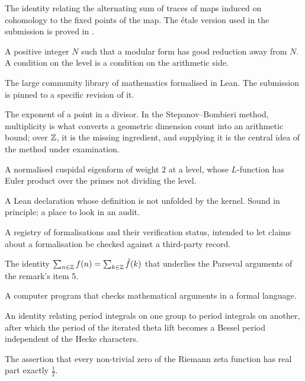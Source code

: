 \begin{description}[style=nextline,leftmargin=0pt,labelwidth=0pt,labelsep=0pt,font=\sffamily\bfseries\small,
  itemsep=5pt]
\item[Lefschetz fixed-point formula] The identity relating the alternating sum
of traces of maps induced on cohomology to the fixed points of the map. The
étale version used in the submission is proved in
.

\item[Level] A positive integer $N$ such that a modular form has good
reduction away from $N$. A condition on the level is a condition on the
arithmetic side.

\item[Mathlib] The large community library of mathematics formalised in Lean.
The submission is pinned to a specific revision of it.

\item[Multiplicity] The exponent of a point in a divisor. In the
Stepanov--Bombieri method, multiplicity is what converts a geometric dimension
count into an arithmetic bound; over $\mathbb{Z}$, it is the missing ingredient, and
supplying it is the central idea of the method under examination.

\item[Newform] A normalised cuspidal eigenform of weight $2$ at a level, whose
$L$-function has Euler product over the primes not dividing the level.

\item[\texttt{opaque}] A Lean declaration whose definition is not unfolded by
the kernel. Sound in principle; a place to look in an audit.

\item[Palomar registry] A registry of formalisations and their verification
status, intended to let claims about a formalisation be checked against a
third-party record.

\item[Poisson summation] The identity
$\sum_{n \in \mathbb{Z}} f(n) = \sum_{k \in \mathbb{Z}} \hat f(k)$ that underlies the
Parseval arguments of the remark's item 5.

\item[Proof assistant] A computer program that checks mathematical arguments
in a formal language.

\item[Rallis seesaw] An identity relating period integrals on one group to
period integrals on another, after which the period of the iterated theta
lift becomes a Bessel period independent of the Hecke characters.

\item[Riemann hypothesis] The assertion that every non-trivial zero of the
Riemann zeta function has real part exactly $\tfrac12$.


\end{description}
